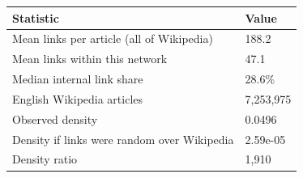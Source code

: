 
\begin{tabular}{ll}
\toprule
Statistic & Value\\
\midrule
Mean links per article (all of Wikipedia) & 188.2\\
Mean links within this network & 47.1\\
Median internal link share & 28.6\%\\
English Wikipedia articles & 7,253,975\\
Observed density & 0.0496\\
Density if links were random over Wikipedia & 2.59e-05\\
Density ratio & 1,910\\
\bottomrule
\end{tabular}
